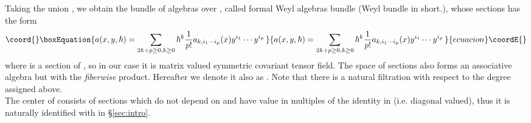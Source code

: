 \documentclass[10pt,a4paper]{article}
\def\h{\hbar}
\begin{document}
Taking the union \coordHE{}, we obtain the bundle of algebras over \coordHE{}, called formal Weyl algebras bundle (Weyl bundle in short.), whose sections has the form 
\begin{equation}\coord{}\boxEquation{
\label{eqn:section}
a(x,y,\h)=\sum_{2k+p\geq0,k\geq0}\h^k {1\over p!}a_{k,i_1\cdots i_p}(x)y^{i_1}\cdots y^{i_p} \,
}{
a(x,y,\h)=\sum_{2k+p\geq0,k\geq0}\h^k {1\over p!}a_{k,i_1\cdots i_p}(x)y^{i_1}\cdots y^{i_p} \,
}{ecuacion}\coordE{}\end{equation}
where \coordHE{} is a section of \coordHE{}, so in our case it is \coordHE{} matrix valued symmetric covariant tensor field. 
The space of sections \coordHE{} also forms an associative algebra but with the {\it fiberwise} \myHighlight{$\circ$}\coordHE{} product. Hereafter we denote it also as  \coordHE{}. Note that there is a natural filtration \coordHE{} with respect to the degree \coordHE{} assigned above.\\

The center \coordHE{} of \coordHE{} consists of sections which do not depend on \coordHE{} and have value in multiples of the identity in \coordHE{} (i.e. diagonal \coordHE{} valued), thus it is naturally identified with \myHighlight{$C^\infty(M)[[\h]]$}\coordHE{} in \S\ref{sec:intro}. \\
\end{document}
